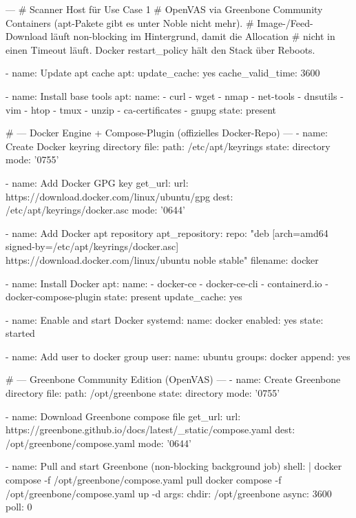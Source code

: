 \begin{GenericCode}
---
# Scanner Host für Use Case 1
# OpenVAS via Greenbone Community Containers (apt-Pakete gibt es unter Noble nicht mehr).
# Image-/Feed-Download läuft non-blocking im Hintergrund, damit die Allocation
# nicht in einen Timeout läuft. Docker restart_policy hält den Stack über Reboots.

- name: Update apt cache
  apt:
    update_cache: yes
    cache_valid_time: 3600

- name: Install base tools
  apt:
    name:
      - curl
      - wget
      - nmap
      - net-tools
      - dnsutils
      - vim
      - htop
      - tmux
      - unzip
      - ca-certificates
      - gnupg
    state: present

# --- Docker Engine + Compose-Plugin (offizielles Docker-Repo) ---
- name: Create Docker keyring directory
  file:
    path: /etc/apt/keyrings
    state: directory
    mode: '0755'

- name: Add Docker GPG key
  get_url:
    url: https://download.docker.com/linux/ubuntu/gpg
    dest: /etc/apt/keyrings/docker.asc
    mode: '0644'

- name: Add Docker apt repository
  apt_repository:
    repo: "deb [arch=amd64 signed-by=/etc/apt/keyrings/docker.asc] https://download.docker.com/linux/ubuntu noble stable"
    filename: docker

- name: Install Docker
  apt:
    name:
      - docker-ce
      - docker-ce-cli
      - containerd.io
      - docker-compose-plugin
    state: present
    update_cache: yes

- name: Enable and start Docker
  systemd:
    name: docker
    enabled: yes
    state: started

- name: Add user to docker group
  user:
    name: ubuntu
    groups: docker
    append: yes

# --- Greenbone Community Edition (OpenVAS) ---
- name: Create Greenbone directory
  file:
    path: /opt/greenbone
    state: directory
    mode: '0755'

- name: Download Greenbone compose file
  get_url:
    url: https://greenbone.github.io/docs/latest/_static/compose.yaml
    dest: /opt/greenbone/compose.yaml
    mode: '0644'

- name: Pull and start Greenbone (non-blocking background job)
  shell: |
    docker compose -f /opt/greenbone/compose.yaml pull
    docker compose -f /opt/greenbone/compose.yaml up -d
  args:
    chdir: /opt/greenbone
  async: 3600
  poll: 0


\end{GenericCode}
